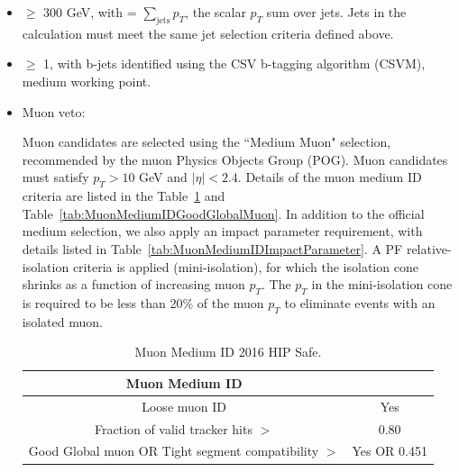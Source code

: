 \begin{itemize}
\item \HT $\ge$ 300 GeV, with \HT = $\sum_{\mathrm{jets}} p_{T}$, the scalar $p_{T}$ sum over jets. Jets in the \HT calculation must meet the same jet selection criteria defined above.

\item \nbjets $\ge$ 1, with b-jets identified using the CSV b-tagging algorithm (CSVM), medium working point.

\item Muon veto:

Muon candidates are selected using the ``Medium Muon" selection, recommended by the muon Physics Objects Group (POG). Muon candidates must satisfy $p_{T}>10$ GeV and $|\eta|<2.4$. Details of the muon medium ID criteria are listed in the Table~\ref{tab:MuonMediumID} and Table~\ref{tab:MuonMediumIDGoodGlobalMuon}. In addition to the official medium selection, we also apply an impact parameter requirement, with details listed in Table~\ref{tab:MuonMediumIDImpactParameter}. A PF relative-isolation criteria is applied (mini-isolation), for which the isolation cone shrinks as a function of increasing muon $p_{T}$. The $p_{T}$ in the mini-isolation cone is required to be less than 20\% of the muon $p_{T}$ to eliminate events with an isolated muon. 

\newsavebox{\closureBox}

\begin{table}[htbp]
\fontsize{10 pt}{1.2 em}
\selectfont
\begin{centering}
\caption{\label{tab:MuonMediumID} Muon Medium ID 2016 HIP Safe.}
\hspace*{-4ex}
\begin{lrbox}{\closureBox}
\begin{tabular}{|c|c|}
\hline
  Muon Medium ID                                      &               \\
\hline
  Loose muon ID                                       & Yes           \\
\hline
  Fraction of valid tracker hits $>$                  & 0.80          \\
\hline
  Good Global muon OR Tight segment compatibility $>$ & Yes OR 0.451 \\
\hline
\end{tabular}
\end{lrbox}
\scalebox{0.80}{\usebox{\closureBox}}
\par\end{centering}
\end{table}


\end{itemize}
